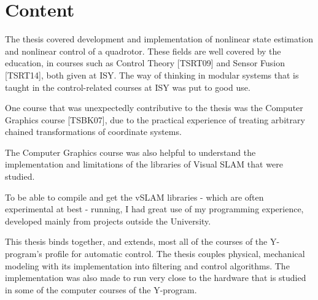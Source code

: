 \section{Content}
\label{sec:content}
	The thesis covered development and implementation of nonlinear
	state estimation and nonlinear control of a quadrotor.
	These fields are well covered by the education, in courses such as Control Theory [TSRT09]
	and Sensor Fusion [TSRT14], both given at ISY. 
	The way of thinking in modular systems that is taught in the control-related
	courses at ISY was put to good use.

	One course that was unexpectedly contributive to the thesis was the 
	Computer Graphics course [TSBK07], due to the practical experience of treating
	arbitrary chained transformations of coordinate systems. 
	
	The Computer Graphics course was also helpful to understand the implementation
	and limitations of the libraries of Visual SLAM that were studied.

	To be able to compile and get the vSLAM libraries - which are often experimental 
	at best - running, I had great use of my programming experience, developed mainly
	from projects outside the University. 

	This thesis binds together, and extends, most all of the courses of the Y-program's
	profile for automatic control. The thesis couples physical, mechanical 
	modeling with its implementation into filtering and control algorithms.
	The implementation was also made to run very close to the hardware that is
	studied in some of the computer courses of the Y-program.
	
	
